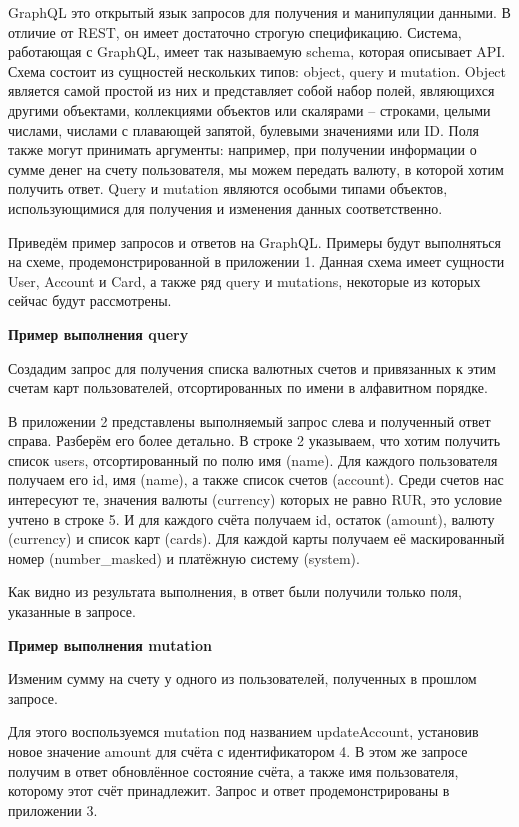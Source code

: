 GraphQL это открытый язык запросов для получения и манипуляции данными.
В отличие от REST, он имеет достаточно строгую спецификацию\cite{graphql-introduction}.
Система, работающая с GraphQL, имеет так называемую schema, которая описывает API. Схема состоит из сущностей нескольких типов: object, query и mutation.
Object является самой простой из них и представляет собой набор полей, являющихся другими объектами, коллекциями объектов или скалярами – строками, целыми числами, числами с плавающей запятой, булевыми значениями или ID. Поля также могут принимать аргументы: например, при получении информации о сумме денег на счету пользователя, мы можем передать валюту, в которой хотим получить ответ.
Query и mutation являются особыми типами объектов, использующимися для получения и изменения данных соответственно.

Приведём пример запросов и ответов на GraphQL. Примеры будут выполняться на схеме, продемонстрированной в приложении 1.
Данная схема имеет сущности User, Account и Card, а также ряд query и mutations, некоторые из которых сейчас будут рассмотрены.

\textbf{Пример выполнения query}

Создадим запрос для получения списка валютных счетов и привязанных к этим счетам карт пользователей, отсортированных по имени в алфавитном порядке.

В приложении 2 представлены выполняемый запрос слева и полученный ответ справа.
Разберём его более детально.
В строке 2 указываем, что хотим получить список users, отсортированный по полю имя (name).
Для каждого пользователя получаем его id, имя (name), а также список счетов (account).
Среди счетов нас интересуют те, значения валюты (currency) которых не равно RUR, это условие учтено в строке 5.
И для каждого счёта получаем id, остаток (amount), валюту (currency) и список карт (cards).
Для каждой карты получаем её маскированный номер (number\_masked) и платёжную систему (system).

Как видно из результата выполнения, в ответ были получили только поля, указанные в запросе.

\textbf{Пример выполнения mutation}

Изменим сумму на счету у одного из пользователей, полученных в прошлом запросе.

Для этого воспользуемся mutation под названием updateAccount, установив новое значение amount для счёта с идентификатором 4.
В этом же запросе получим в ответ обновлённое состояние счёта, а также имя пользователя, которому этот счёт принадлежит.
Запрос и ответ продемонстрированы в приложении 3.


